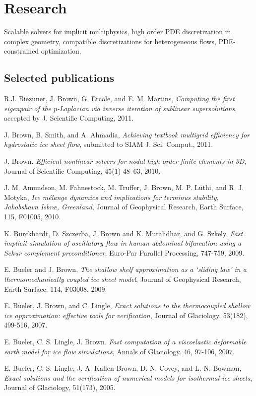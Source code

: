 \documentclass[10pt,letterpaper]{article}
\newcommand\ptitle[1]{\textit{#1}} %
\renewenvironment{itemize}{
  \begin{list}{}{
    \setlength{\leftmargin}{1.5em}
    \setlength{\itemsep}{0.25em}
    \setlength{\parskip}{0pt}
    \setlength{\parsep}{0.25em}
  }
}{
  \end{list}
}
\begin{document}
\section*{Research}
\begin{itemize}\item Scalable solvers for implicit multiphysics, high order PDE
  discretization in complex geometry, compatible discretizations for
  heterogeneous flows, PDE-constrained optimization.
\end{itemize}
\subsection*{Selected publications}
\begin{itemize}
\item R.J. Biezuner, J. Brown, G. Ercole, and E. M. Martins, \ptitle{Computing the first eigenpair of the $p$-Laplacian via inverse iteration of sublinear supersolutions}, accepted by J. Scientific Computing, 2011.
\item J. Brown, B. Smith, and A. Ahmadia, \ptitle{Achieving textbook multigrid efficiency for hydrostatic ice sheet flow}, submitted to SIAM J. Sci. Comput., 2011.
\item J. Brown, \ptitle{Efficient nonlinear solvers for nodal high-order finite elements in 3D}, Journal of Scientific Computing, 45(1) 48--63, 2010.
\item J. M. Amundson, M. Fahnestock, M. Truffer, J. Brown, M. P. L\"uthi, and R. J. Motyka, \ptitle{Ice m\'elange dynamics and implications for terminus stability, Jakobshavn Isbr\ae, Greenland}, Journal of Geophysical Research, Earth Surface, 115, F01005, 2010.
\item K. Burckhardt, D. Szczerba, J. Brown and K. Muralidhar, and G. Szkely. \ptitle{Fast implicit simulation of oscillatory flow in human abdominal bifurcation using a Schur complement preconditioner}, Euro-Par Parallel Processing, 747-759, 2009.
\item E. Bueler and J. Brown, \ptitle{The shallow shelf approximation as a `sliding law' in a thermomechanically coupled ice sheet model}, Journal of Geophysical Research, Earth Surface. 114, F03008, 2009.
\item E. Bueler, J. Brown, and C. Lingle, \ptitle{Exact solutions to the thermocoupled shallow ice approximation: effective tools for verification}, Journal of Glaciology. 53(182), 499-516, 2007.
\item E. Bueler, C. S. Lingle, J. Brown. \ptitle{Fast computation of a viscoelastic deformable earth model for ice flow simulations}, Annals of Glaciology. 46, 97-106, 2007.
\item E. Bueler, C. S. Lingle, J. A. Kallen-Brown, D. N. Covey, and L. N. Bowman, \ptitle{Exact solutions and the verification of numerical models for isothermal ice sheets}, Journal of Glaciology, 51(173), 2005.
\end{itemize}
\end{document}

